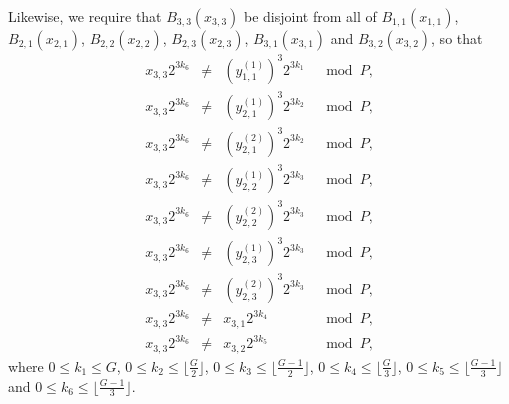 Likewise, we require that $B_{3,3}(x_{3,3})$ be disjoint from all of
$B_{1,1}(x_{1,1})$, $B_{2,1}(x_{2,1})$, $B_{2,2}(x_{2,2})$,
$B_{2,3}(x_{2,3})$, $B_{3,1}(x_{3,1})$ and $B_{3,2}(x_{3,2})$, so
that
\begin{equation}\label{eqx33}\begin{array}{cccc}
x_{3,3}2^{3k_6} &\neq& (y_{1,1}^{(1)})^3 2^{3k_1} &\mod P, \\
x_{3,3}2^{3k_6} &\neq& (y_{2,1}^{(1)})^3 2^{3k_2} &\mod P, \\
x_{3,3}2^{3k_6} &\neq& (y_{2,1}^{(2)})^3 2^{3k_2} &\mod P, \\
x_{3,3}2^{3k_6} &\neq& (y_{2,2}^{(1)})^3 2^{3k_3} &\mod P, \\
x_{3,3}2^{3k_6} &\neq& (y_{2,2}^{(2)})^3 2^{3k_3} &\mod P, \\
x_{3,3}2^{3k_6} &\neq& (y_{2,3}^{(1)})^3 2^{3k_3} &\mod P, \\
x_{3,3}2^{3k_6} &\neq& (y_{2,3}^{(2)})^3 2^{3k_3} &\mod P, \\
x_{3,3}2^{3k_6} &\neq& x_{3,1} 2^{3k_4} &\mod P, \\
x_{3,3}2^{3k_6} &\neq& x_{3,2} 2^{3k_5} &\mod P,
\end{array}\end{equation}
where $0 \leq k_1 \leq G$, $0 \leq k_2 \leq \lfloor \frac{G}{2}
\rfloor$, $0 \leq k_3 \leq \lfloor\frac{G-1}{2} \rfloor$, $0 \leq
k_4 \leq \lfloor\frac{G}{3} \rfloor$, $0 \leq k_5 \leq
\lfloor\frac{G-1}{3} \rfloor$ and $0 \leq k_6 \leq
\lfloor\frac{G-1}{3} \rfloor$.

